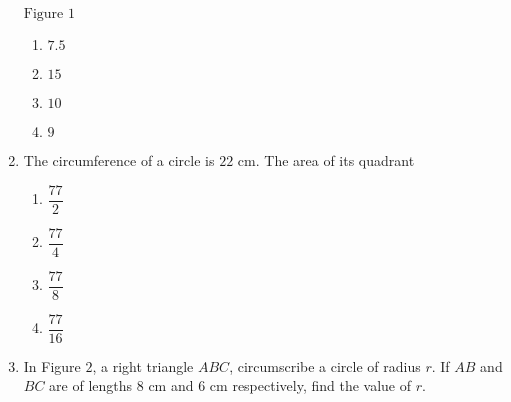 \documentclass[journal,12pt,onecolumn]{IEEEtran}
\theoremstyle{remark}
\begin{document}
\begin{enumerate}
\begin{figure} [h]
\end{figure}
\begin{center}
$\text{Figure } 1$
\end{center}
\begin{enumerate}
\item $7.5$\\
\item $15$\\
\item $10$\\
\item $9$\\
\end{enumerate}
\item The circumference of a circle is $22 \text{ cm}$. The area of its quadrant 
\begin{enumerate}
\item $\dfrac{77}{2}$\\
\item $\dfrac{77}{4}$\\
\item $\dfrac{77}{8}$\\
\item $\dfrac{77}{16}$\\
\end{enumerate}
\item In Figure $2$, a right triangle $ABC$, circumscribe a circle of radius $r$. If $AB$ and $BC$ are of lengths $8 \text{ cm}$ and $6 \text{ cm}$ respectively, find the value of $r$.
\begin{figure}[ht]
\centering
{}
\end{figure}
\end{enumerate}
\end{document}

